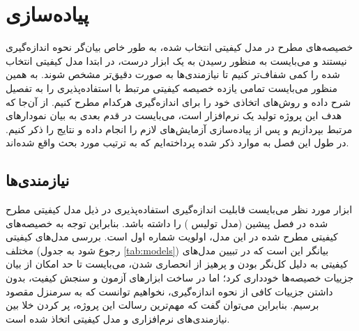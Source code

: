 \chapter{پیاده‌سازی}
خصیصه‌های مطرح در مدل کیفیتی انتخاب شده، به طور خاص بیان‌گر نحوه اندازه‌گیری نیستند و می‌بایست به منظور رسیدن به یک ابزار درست، در ابتدا مدل‌ کیفیتی انتخاب شده را کمی شفاف‌تر کنیم تا نیازمندی‌ها به صورت دقیق‌تر مشخص شوند. به همین منظور می‌بایست تمامی یازده خصیصه کیفیتی مرتبط با استفاده‌پذیری را به تفصیل شرح داده و روش‌های اتخاذی خود را برای اندازه‌گیری هرکدام مطرح کنیم. از آن‌جا که هدف این پروژه تولید یک نرم‌افزار است، می‌بایست در قدم بعدی به بیان نمودارهای مرتبط بپردازیم و پس از پیاده‌سازی آزمایش‌های لازم را انجام داده و نتایج را ذکر کنیم. در طول این فصل به موارد ذکر شده پرداخته‌ایم که به ترتیب مورد بحث واقع شده‌اند.
\section{نیازمندی‌ها}
ابزار مورد نظر می‌بایست قابلیت اندازه‌گیری استفاده‌پذیری در ذیل مدل کیفیتی مطرح شده در فصل پیشین (مدل تولیس
\cite{albert_measuring_2013})
را داشته باشد. بنابراین توجه به خصیصه‌های کیفیتی مطرح شده در این مدل، اولویت شماره اول است. بررسی مدل‌های کیفیتی مختلف (رجوع شود به جدول
\ref{tab:models})
بیانگر این است که در تبیین مدل‌های کیفیتی به دلیل کل‌نگر بودن و پرهیز از انحصاری شدن، می‌بایست تا حد امکان از بیان جزییات خصیصه‌ها خودداری کرد؛ اما در ساخت ابزارهای آزمون و سنجش کیفیت، بدون داشتن جزییات کافی از نحوه اندازه‌گیری، نخواهیم توانست که به سرمنزل مقصود برسیم. بنابراین می‌توان گفت که مهم‌ترین رسالت این پروژه، پر کردن خلا بین نیازمندی‌های نرم‌افزاری و مدل کیفیتی اتخاذ شده است.
